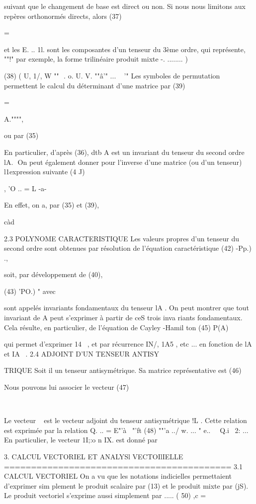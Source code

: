{{{{{{{{{{{{{{{{{{{{suivant que le changement de base est direct ou non. Si nous nous limitons aux repères orthonormés directs, alors 
(37) 

= 

et les E. .. 1l. sont les composantes d'un tenseur du 3ème ordre, qui représente,
""!" 
par exemple, la forme trilinéaire produit mixte 
-. ........ )

(38) ( U, 1/, W ""  . o. U. V. \ND
""â'" ... ~ '" Les symboles de permutation permettent le calcul du déterminant 
d'une matrice par 
(39) 

= 

A."""", 

ou par (35) 

En particulier, d'après (36), dtb A est un invariant du tenseur du second ordre lA.  On peut également donner pour l'inverse d'une matrice (ou d'un 
tenseur) l1expression suivante 
(4 J) 

, 'O .. = 
L 
-a-

En effet, on a, par (35) et (39), 


càd 

2.3 POLYNOME CARACTERISTIQUE 
Les valeurs propres d'un tenseur du second ordre sont obtenues par résolution de l'équation caractéristique 
(42) -Pp.) ., 

soit, par développement de (40), 


(43) 'PO.) " 
avec 

sont appelés invariants fondamentaux du tenseur lA . On peut 
montrer 
que tout invariant de A peut s'exprimer à partir de ceS trois inva­
riants fondamentaux. Cela résulte, en particulier, de l'équation de Cayley -Hamil ton 
(45) P(A) 

qui permet d'exprimer 14~ , et par récurrence IN/, 1A5 , etc ... en fonction de lA et IA~ . 
2.4 	ADJOINT D'UN TENSEUR ANTISY}TRIQUE Soit il un tenseur antisymétrique. Sa matrice représentative est 
(46) 


Nous pouvons lui associer le vecteur 
(47) 

 

Le vecteur ~ est le vecteur adjoint du tenseur antisymétrique !L . Cette relation est exprimée par la relation 
{ 
Q. .. 
= E"'à~ 	"'ft
(48) 	""'a 
../
w.
... " 	e..~~ Q.i~
2: 
... 
~ 
En particulier, le vecteur 1I;}:o n IX. est donné par 

3. CALCUL VECTORIEL ET ANALYSl VECTOIlIELLE 
========================================== 
3.1 CALCUL VECTORIEL 
On a vu que les notations indicielles permettaient d'exprimer sim­
plement le produit scalaire par (13) et le produit mixte par (jS). Le produit 
vectoriel s'exprime aussi simplement par 
..... 
( 50) ,c = 

}}}}}}}}}}}}}}}}}}}
